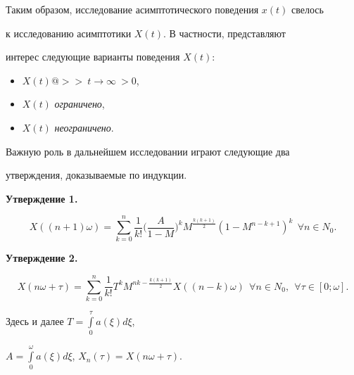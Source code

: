 Таким образом, исследование асимптотического поведения $x(t)$ свелось 


к исследованию асимптотики $X(t)$. В частности, представляют 


интерес следующие варианты поведения $X(t)$: 


\begin{itemize} 


\item[(а)] $X(t)@>>{\ t\to\infty\ }>0$, 


\item[(б)] $X(t)$ {\it ограничено}, 


\item[(в)] $X(t)$ {\it неограничено}. 


\end{itemize} 


 


Важную роль в дальнейшем исследовании играют следующие два 


утверждения, доказываемые по индукции. 


\medskip 


 


{\bf Утверждение 1.} 


\begin{equation} 


X((n+1)\omega)=\sum^n_{k=0}\frac{1}{k!} 


\bigg(\frac{A}{1-M} \bigg)^k M^{\frac{k(k+1)}{2}} 


(1-M^{n-k+1})^k\ \ \forall n\in N_0. 


\end{equation} 


 


{\bf Утверждение 2.} 


\begin{equation} 


X(n\omega+\tau)=\sum^n_{k=0}\frac{1}{k!} T^k


M^{n k-\frac{k(k+1)}{2}}X((n-k)\omega) 


\ \ \forall n\in N_0,\ \ \forall\tau\in[0;\omega]. 


\end{equation} 


 


Здесь и далее $T=\int\limits^\tau_0 a(\xi)d\xi$, 


$A=\int\limits^\omega_0 a(\xi)d\xi$, $X_n(\tau)=X(n\omega+\tau)$. 


